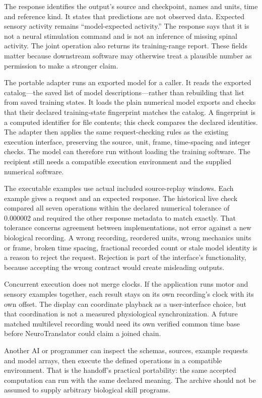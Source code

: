 The response identifies the output's source and checkpoint, names and units, time and reference kind. It states that predictions are not observed data. Expected sensory activity remains ``model-expected activity.'' The response says that it is not a neural stimulation command and is not an inference of missing spinal activity. The joint operation also returns its training-range report. These fields matter because downstream software may otherwise treat a plausible number as permission to make a stronger claim.

The portable adapter runs an exported model for a caller. It reads the exported
catalog---the saved list of model descriptions---rather than rebuilding that
list from saved training states. It loads the plain numerical model exports
and checks that their declared training-state fingerprint matches the catalog.
A fingerprint is a computed identifier for file contents; this check compares
the declared identities. The adapter then applies the same request-checking
rules as the existing execution interface, preserving the source, unit, frame,
time-spacing and integer checks. The model can therefore run without loading
the training software. The recipient still needs a compatible execution
environment and the supplied numerical software.

The executable examples use actual included source-replay windows. Each example gives a request and an expected response. The historical live check compared all seven operations within the declared numerical tolerance of 0.000002 and required the other response metadata to match exactly. That tolerance concerns agreement between implementations, not error against a new biological recording. A wrong recording, reordered units, wrong mechanics units or frame, broken time spacing, fractional recorded count or stale model identity is a reason to reject the request. Rejection is part of the interface's functionality, because accepting the wrong contract would create misleading outputs.

Concurrent execution does not merge clocks. If the application runs motor and sensory examples together, each result stays on its own recording's clock with its own offset. The display can coordinate playback as a user-interface choice, but that coordination is not a measured physiological synchronization. A future matched multilevel recording would need its own verified common time base before NeuroTranslator could claim a joined chain.

Another AI or programmer can inspect the schemas, sources, example requests and model arrays, then execute the defined operations in a compatible environment. That is the handoff's practical portability: the same accepted computation can run with the same declared meaning. The archive should not be assumed to supply arbitrary biological skill programs.

